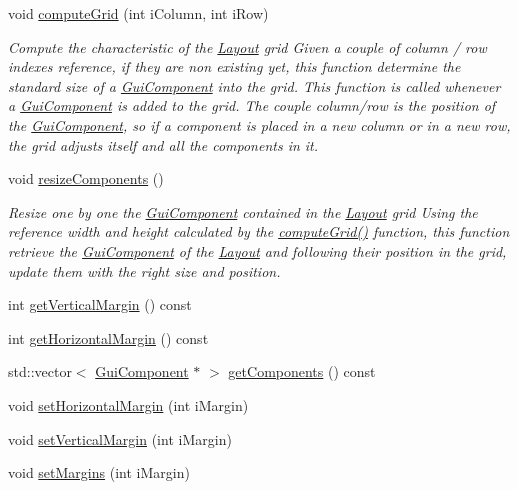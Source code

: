 \begin{DoxyCompactItemize}
void \hyperlink{class_symp_1_1_layout_a5ccafed047774ddb69c6e87480ae74ee}{compute\-Grid} (int i\-Column, int i\-Row)
\begin{DoxyCompactList}\small\item\em Compute the characteristic of the \hyperlink{class_symp_1_1_layout_acd02d4152c342a37567cbbdcec57814f}{Layout} grid Given a couple of column / row indexes reference, if they are non existing yet, this function determine the standard size of a \hyperlink{class_symp_1_1_gui_component_a22124675c2976983ac18374f81cc3fb3}{Gui\-Component} into the grid. This function is called whenever a \hyperlink{class_symp_1_1_gui_component_a22124675c2976983ac18374f81cc3fb3}{Gui\-Component} is added to the grid. The couple column/row is the position of the \hyperlink{class_symp_1_1_gui_component_a22124675c2976983ac18374f81cc3fb3}{Gui\-Component}, so if a component is placed in a new column or in a new row, the grid adjusts itself and all the components in it. \end{DoxyCompactList}\item 
void \hyperlink{class_symp_1_1_layout_ab6f730d068d35ee75672ced8d06051a4}{resize\-Components} ()
\begin{DoxyCompactList}\small\item\em Resize one by one the \hyperlink{class_symp_1_1_gui_component_a22124675c2976983ac18374f81cc3fb3}{Gui\-Component} contained in the \hyperlink{class_symp_1_1_layout_acd02d4152c342a37567cbbdcec57814f}{Layout} grid Using the reference width and height calculated by the \hyperlink{class_symp_1_1_layout_a5ccafed047774ddb69c6e87480ae74ee}{compute\-Grid()} function, this function retrieve the \hyperlink{class_symp_1_1_gui_component_a22124675c2976983ac18374f81cc3fb3}{Gui\-Component} of the \hyperlink{class_symp_1_1_layout_acd02d4152c342a37567cbbdcec57814f}{Layout} and following their position in the grid, update them with the right size and position. \end{DoxyCompactList}\item 
int \hyperlink{class_symp_1_1_layout_a5a7d9879416e1fb408d76f371c878f16}{get\-Vertical\-Margin} () const 
\item 
int \hyperlink{class_symp_1_1_layout_a612d289b9e6b1300a56cbe5c5ccc6dd8}{get\-Horizontal\-Margin} () const 
\item 
std\-::vector$<$ \hyperlink{class_symp_1_1_gui_component}{Gui\-Component} $\ast$ $>$ \hyperlink{class_symp_1_1_layout_a2a0e436be7c12e5c4d4854d2a86629a5}{get\-Components} () const 
\item 
void \hyperlink{class_symp_1_1_layout_a41abf7a0cabb0ccd6de59a14f78c1916}{set\-Horizontal\-Margin} (int i\-Margin)
\item 
void \hyperlink{class_symp_1_1_layout_ae9c9d682a5ed31a7ca80136d365f249e}{set\-Vertical\-Margin} (int i\-Margin)
\item 
void \hyperlink{class_symp_1_1_layout_a6f50ff9c6d911ff688bfe86125f11c60}{set\-Margins} (int i\-Margin)
\end{DoxyCompactItemize}
